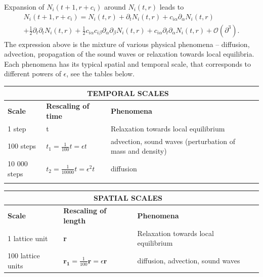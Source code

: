 Expansion of $N_i(t+1,r+c_i)$ around $N_i(t,r)$ leads to
\begin{equation} \label{rozvoj t+1}
\begin{split}
N_i(t+1,r+c_i) = N_i(t,r) + \partial_t N_i(t,r) + c_{i\alpha} \partial_{\alpha} N_i(t,r) \\ 
+ \frac{1}{2} \partial_t \partial_t N_i(t,r) + \frac{1}{2} c_{i\alpha}c_{i\beta} \partial_{\alpha} \partial_{\beta} N_i(t,r) + c_{i\alpha} \partial_t \partial_{\alpha} N_i(t,r) + \mathcal{O}(\partial^3).
\end{split}
\end{equation}
\bigskip
The expression above is the mixture of various physical phenomena -- diffusion, advection, propagation of the sound waves or relaxation towards local equilibria. Each phenomena has its typical spatial and temporal scale, that corresponds to different powers of $\epsilon$, see the tables below. %

\begin{center} 
    \begin{tabular}{| l | l | l | l |}
    \hline
    \multicolumn{3}{|c|}{ \label{scalings} TEMPORAL SCALES}\\ \hline
    \textbf{Scale} & \textbf{Rescaling of time} & \textbf{Phenomena} \\ \hline
    1 step & t & Relaxation towards local equilibrium \\ \hline
    100 steps & $t_1 = \frac{1}{100} t = \epsilon t$ & advection, sound waves (perturbation of mass and density) \\ \hline
    10 000 steps & $t_2 = \frac{1}{10000} t = \epsilon^2 t$ & diffusion \\ \hline
    \label{scalings}
    \end{tabular}
\end{center}


\begin{center}
    \begin{tabular}{| l | l | l | l |}
    \hline
    \multicolumn{3}{|c|}{SPATIAL SCALES}\\ \hline
    \textbf{Scale} & \textbf{Rescaling of length} & \textbf{Phenomena} \\ \hline
    1 lattice unit & \textbf{r} & Relaxation towards local equilibrium \\ \hline
    100 lattice units & $\bm{r_1} = \frac{1}{100} \bm{r} = \epsilon \bm{r}$ & diffusion, advection, sound waves\\ \hline
    \end{tabular}
\end{center}

